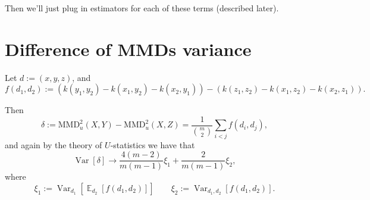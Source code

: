 \documentclass{article}
\DeclareMathOperator{\E}{\mathbb{E}}
\DeclareMathOperator{\Var}{Var}
\begin{document}
Then we'll just plug in estimators for each of these terms (described later).


\section{Difference of MMDs variance}

Let $d := (x, y, z)$, and
\[
f(d_1, d_2) := 
\left( k(y_1, y_2) - k(x_1, y_2) - k(x_2, y_1) \right)
- \left( k(z_1, z_2) - k(x_1, z_2) - k(x_2, z_1) \right)
.\]

Then
\[
  \delta := \mathrm{MMD}_u^2(X, Y) - \mathrm{MMD}_u^2(X, Z) = \frac{1}{\binom{m}{2}} \sum_{i < j} f(d_i, d_j),
\]
and again by the theory of $U$-statistics we have that
\[
\Var[\delta] \to \frac{4 (m-2)}{m (m-1)} \xi_1 + \frac{2}{m (m-1)} \xi_2
,\]
where
\[
\xi_1 := \Var_{d_1}\left[ \E_{d_2}\left[ f(d_1, d_2) \right] \right]
\qquad
\xi_2 := \Var_{d_1, d_2}\left[ f(d_1, d_2) \right]
.\]
\end{document}
